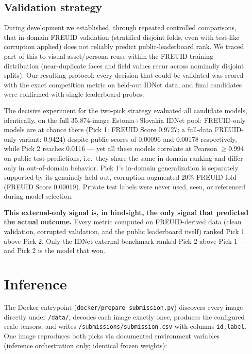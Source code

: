 \documentclass[11pt,a4paper]{article}
\begin{document}
\subsection{Validation strategy}
\label{sec:validation}
During development we established, through repeated controlled comparisons, that
in-domain FREUID validation (stratified disjoint folds, even with test-like
corruption applied) does not reliably predict public-leaderboard rank. We traced
part of this to visual asset/persona reuse within the FREUID training
distribution (near-duplicate faces and field values recur across nominally
disjoint splits). Our resulting protocol: every decision that could be validated
was scored with the exact competition metric on held-out IDNet data, and final
candidates were confirmed with single leaderboard probes.

The decisive experiment for the two-pick strategy evaluated all candidate
models, identically, on the full 35{,}874-image Estonia+Slovakia IDNet pool:
FREUID-only models are at chance there (Pick 1: FREUID Score 0.9727; a
full-data FREUID-only variant: 0.9424) despite public scores of 0.00096 and
0.00178 respectively, while Pick 2 reaches 0.0116 --- yet all these models
correlate at Pearson $\ge$0.994 on public-test predictions, i.e.\ they share
the same in-domain ranking and differ only in out-of-domain behavior. Pick 1's
in-domain generalization is separately supported by its genuinely held-out,
corruption-augmented 20\% FREUID fold (FREUID Score 0.00019). Private test
labels were never used, seen, or referenced during model selection.

\textbf{This external-only signal is, in hindsight, the only signal that
predicted the actual outcome.} Every metric computed on FREUID-derived data
(clean validation, corrupted validation, and the public leaderboard itself)
ranked Pick 1 above Pick 2. Only the IDNet external benchmark ranked Pick 2
above Pick 1 --- and Pick 2 is the model that won.

\section{Inference}
\label{sec:inference}
The Docker entrypoint (\texttt{docker/prepare\_submission.py}) discovers every
image directly under \texttt{/data/}, decodes each image exactly once, produces
the configured scale tensors, and writes \texttt{/submissions/submission.csv}
with columns \texttt{id,label}. One image reproduces both picks via documented
environment variables (inference orchestration only; identical frozen weights):
\end{document}
